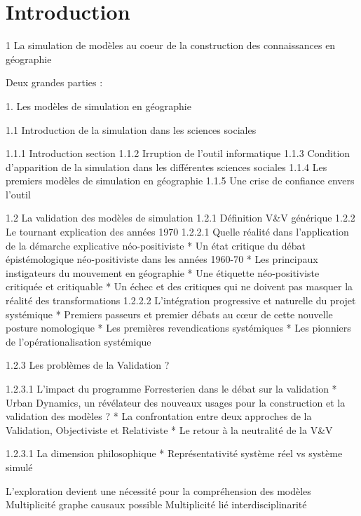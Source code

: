 
\chapter{Introduction}

\startcontents[chapters]
\Mprintcontents


1 La simulation de modèles au coeur de la construction des connaissances en géographie

Deux grandes parties : 

1. Les modèles de simulation en géographie

1.1 Introduction de la simulation dans les sciences sociales 
	
	1.1.1 Introduction section
	1.1.2 Irruption de l'outil informatique
	1.1.3 Condition d'apparition de la simulation dans les différentes sciences sociales
	1.1.4 Les premiers modèles de simulation en géographie
	1.1.5 Une crise de confiance envers l'outil

1.2 La validation des modèles de simulation
	1.2.1 Définition V&V générique
	1.2.2 Le tournant explication des années 1970
		1.2.2.1 Quelle réalité dans l'application de la démarche explicative néo-positiviste
			* Un état critique du débat épistémologique néo-positiviste dans les années 1960-70
			* Les principaux instigateurs du mouvement en géographie
			* Une étiquette néo-positiviste critiquée et critiquable
			* Un échec et des critiques qui ne doivent pas masquer la réalité des transformations
		1.2.2.2 L'intégration progressive et naturelle du projet systémique
			* Premiers passeurs et premier débats au cœur de cette nouvelle posture nomologique
			* Les premières revendications systémiques
			* Les pionniers de l'opérationalisation systémique

	1.2.3 Les problèmes de la Validation ?
	
		1.2.3.1 L'impact du programme Forresterien dans le débat sur la validation 
			* Urban Dynamics, un révélateur des nouveaux usages pour la construction et la validation des modèles ?
			* La confrontation entre deux approches de la Validation, Objectiviste et Relativiste
			* Le retour à la neutralité de la V\&V


		1.2.3.1 La dimension philosophique
			* Représentativité système réel vs système simulé

L'exploration devient une nécessité pour la compréhension des modèles
	Multiplicité graphe causaux possible
	Multiplicité lié interdisciplinarité

